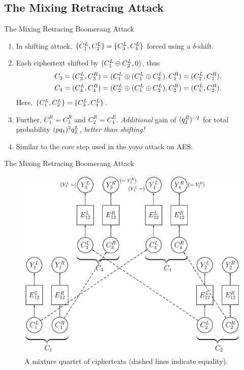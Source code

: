 \documentclass[notheorems]{beamer}
\theoremstyle{definition}
\theoremstyle{example}
\begin{document}
    \subsection{The Mixing Retracing Attack}
    \label{subsec:mix-retr-boomerang}

    \begin{frame}[<+->]{The Mixing Retracing Boomerang Attack}
        \begin{enumerate}
            \item In shifting attack, \(\{C_1^L, C_2^L\} = \{C_3^L,
            C_4^L\}\) forced using a \(\delta\)-shift.
            \item Each ciphertext shifted by \((C_1^L \oplus C_2^L, 0)\),
            thus
            \begin{align}
                C_3 &= (C_3^L, C_3^R) = (C_1^L \oplus (C_1^L \oplus C_2^L), C_1^R) = (C_2^L, C_1^R), \\
                C_4 &= (C_4^L, C_4^R) = (C_2^L \oplus (C_1^L \oplus C_2^L), C_2^R) = (C_1^L, C_2^R).
            \end{align}
            Here, \(\{C_1^L, C_2^L\} = \{C_3^L, C_4^L\}\).
            \item Further, \(C_1^R = C_3^R\) and \(C_2^R = C_4^R\).
            \emph{Additional} gain of \((q_2^R)^{-2}\) for total
            probability \((pq_1)^2q_2^L\), \emph{better than shifting!}
            \item Similar to the core step used in the yoyo attack on AES.
        \end{enumerate}
    \end{frame}

    \begin{frame}{The Mixing Retracing Boomerang Attack}
        \begin{figure}
            \centering
            \includegraphics[width=0.55\columnwidth]{images/mixing_boomerang.png}
            \caption{A mixture quartet of ciphertexts (dashed lines indicate equality).}
        \end{figure}
    \end{frame}
\end{document}
